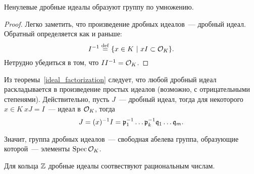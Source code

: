 	\begin{statement} 
		Ненулевые дробные идеалы образуют группу по умножению. 
	\end{statement}

	\begin{proof}
		Легко заметить, что произведение дробных идеалов~--- дробный идеал. Обратный определяется как и раньше:
		\[
			I^{-1} \stackrel{\mathrm{def}}{=} \{ x \in K \ \vert \ xI \subset \mathcal{O}_{K} \}.
		\]
		Нетрудно убедиться в том, что $I I^{-1} = \mathcal{O}_{K}$. 
	\end{proof}

	Из теоремы~\ref{ideal_factorization} следует, что любой дробный идеал раскладывается в произведение простых идеалов (возможно, с отрицательными степенями). Действительно, пусть $J$~--- дробный идеал, тогда для некоторого $x \in K \ xJ = I$~--- идеал в $\mathcal{O}_{K}$, тогда 
	\[
		J = (x)^{-1}I = \mathfrak{p}_{1}^{-1} \ldots \mathfrak{p}_{k}^{-1} \mathfrak{q}_{1}\ldots \mathfrak{q}_{m}.
	\]

	Значит, группа дробных идеалов~--- свободная абелева группа, образующие которой~--- элементы $\operatorname{Spec}{\mathcal{O}_{K}}$.

	\begin{example}
		Для кольца $\mathbb{Z}$ дробные идеалы соотвествуют рациональным числам. 
	\end{example}

